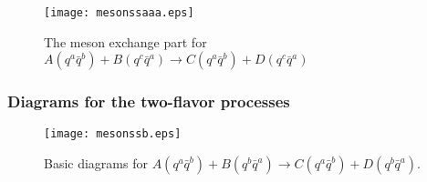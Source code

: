 \documentclass[8pt]{beamer}
\begin{document}
\begin{frame}
	\begin{figure}[hbt]
		\begin{center}
			\texttt{[image: mesonssaaa.eps]}\\
			\caption{The meson exchange part for $A(q^a\bar
					q^b)+B(q^c\bar q^a)\rightarrow C(q^a\bar q^b)+D(q^c\bar
					q^a)$}\label{mesonscatteringaaa}
		\end{center}
	\end{figure}
\end{frame}

\begin{frame}
	\frametitle{Diagrams for the two-flavor processes}

	\begin{figure}[hbt]
		\begin{center}
			\texttt{[image: mesonssb.eps]}\\
			\caption{Basic diagrams for $A(q^a\bar q^b)+B(q^b\bar q^a)\rightarrow C(q^a\bar q^b)+D(q^b\bar q^a)$.}\label{mesonssb}
		\end{center}
	\end{figure}

\end{frame}
\end{document}

